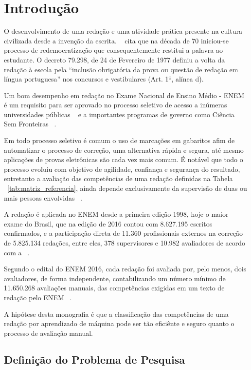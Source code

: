 \chapter{Introdução}\label{CAP:introducao}

\noindent O desenvolvimento de uma redação e uma atividade prática presente na cultura civilizada desde a invenção da escrita. ~\cite{lara:1995} cita que na década de 70 iniciou-se processo de redemocratização que consequentemente restitui a palavra ao estudante. O decreto 79.298, de 24 de Fevereiro de 1977 definiu a volta da redação à escola pela ``inclusão obrigatória da prova ou questão de redação em língua portuguesa'' nos concursos e vestibulares (Art. 1º, alínea d).

Um bom desempenho em redação no Exame Nacional de Ensino Médio - ENEM é um requisito para ser aprovado no processo seletivo de acesso a inúmeras universidades públicas ~\cite{sisu:2017} e a importantes programas de governo como Ciência Sem Fronteiras ~\cite{csf:2017}.

Em todo processo seletivo é comum o uso de marcações em gabaritos afim de automatizar o processo de correção, uma alternativa rápida e segura, até mesmo aplicações de provas eletrônicas são cada vez mais comum. É notável que todo o processo evoluiu com objetivo de agilidade, confiança e segurança do resultado, entretanto a avaliação das competências de uma redação definidas na Tabela ~\ref{tab:matriz_referencia}, ainda depende exclusivamente da supervisão de duas ou mais pessoas envolvidas ~\cite{edital_enem:2016}.

A redação é aplicada no ENEM desde a primeira edição 1998, hoje o maior exame do Brasil, que na edição de 2016 contou com 8.627.195 escritos confirmados, e a participação direta de 11.360 profissionais externos na correção de 5.825.134 redações, entre eles, 378 supervisores e 10.982 avaliadores de acordo com a ~\cite{relatorio_de_gestao:2016}. 

Segundo o edital do ENEM 2016, cada redação foi avaliada por, pelo menos, dois avaliadores, de forma independente, contabilizando um número mínimo de 11.650.268 avaliações manuais, das competências exigidas em um texto de redação pelo ENEM ~\cite{edital_enem:2016}.

A hipótese desta monografia é que a classificação das competências de uma redação por aprendizado de máquina 
pode ser tão eficiênte e seguro quanto o processo de avaliação manual.

\section{Definição do Problema de Pesquisa}

